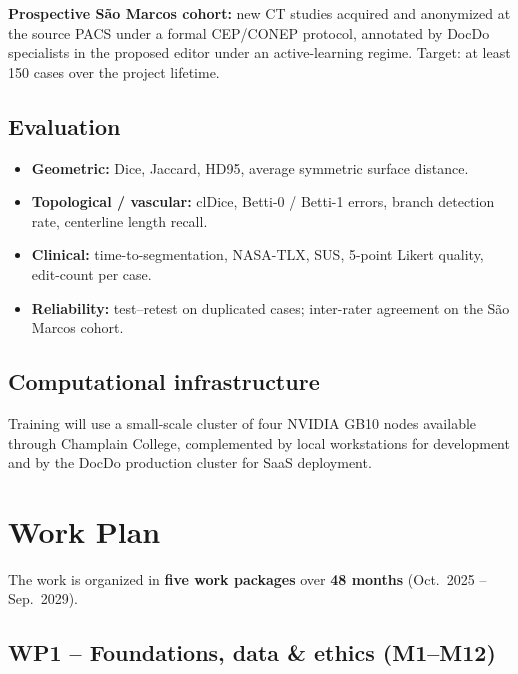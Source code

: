 \documentclass[a4paper,11pt,twoside]{article}
\begin{document}
\textbf{Prospective S\~ao Marcos cohort:} new CT studies acquired and
anonymized at the source PACS under a formal CEP/CONEP protocol, annotated by
DocDo specialists in the proposed editor under an active-learning regime.
Target: at least 150 cases over the project lifetime.

\subsection{Evaluation}

\begin{itemize}
  \item \textbf{Geometric:} Dice, Jaccard, HD95, average symmetric surface
        distance.
  \item \textbf{Topological / vascular:} clDice, Betti-0 / Betti-1 errors,
        branch detection rate, centerline length recall.
  \item \textbf{Clinical:} time-to-segmentation, NASA-TLX, SUS,
        5-point Likert quality, edit-count per case.
  \item \textbf{Reliability:} test--retest on duplicated cases; inter-rater
        agreement on the S\~ao Marcos cohort.
\end{itemize}

\subsection{Computational infrastructure}

Training will use a small-scale cluster of four NVIDIA GB10 nodes available
through Champlain College, complemented by local workstations for development
and by the DocDo production cluster for SaaS deployment.

\section{Work Plan}

The work is organized in \textbf{five work packages} over \textbf{48 months}
(Oct.~2025 -- Sep.~2029).

\subsection{WP1 -- Foundations, data \& ethics (M1--M12)}
\end{document}
